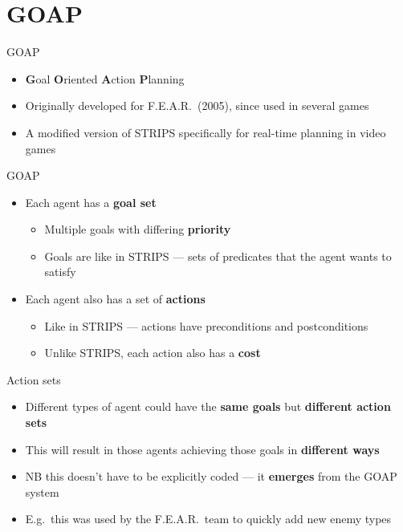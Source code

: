 \part{GOAP}
\frame{\partpage}

\begin{frame}{GOAP}
    \begin{itemize}
        \pause\item \textbf{G}oal \textbf{O}riented \textbf{A}ction \textbf{P}lanning
        \pause\item Originally developed for F.E.A.R.\ (2005), since used in several games
        \pause\item A modified version of STRIPS specifically for real-time planning in video games
    \end{itemize}
\end{frame}

\begin{frame}{GOAP}
    \begin{itemize}
        \pause\item Each agent has a \textbf{goal set}
            \begin{itemize}
                \pause\item Multiple goals with differing \textbf{priority}
                \pause\item Goals are like in STRIPS --- sets of predicates that the agent wants to satisfy
            \end{itemize}
        \pause\item Each agent also has a set of \textbf{actions}
            \begin{itemize}
                \pause\item Like in STRIPS --- actions have preconditions and postconditions
                \pause\item Unlike STRIPS, each action also has a \textbf{cost}
            \end{itemize}
    \end{itemize}
\end{frame}

\begin{frame}{Action sets}
    \begin{itemize}
        \pause\item Different types of agent could have the \textbf{same goals} but \textbf{different action sets}
        \pause\item This will result in those agents achieving those goals in \textbf{different ways}
        \pause\item NB this doesn't have to be explicitly coded --- it \textbf{emerges} from the GOAP system
        \pause\item E.g.\ this was used by the F.E.A.R.\ team to quickly add new enemy types
    \end{itemize}
\end{frame}

